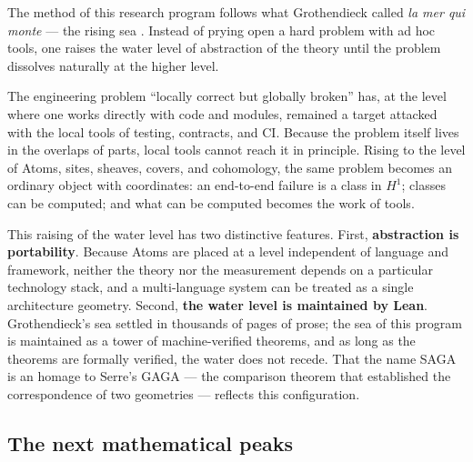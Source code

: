 The method of this research program follows what Grothendieck called
\emph{la mer qui monte} --- the rising sea \citep{grothendieck2022recoltes}.
Instead of prying open a hard problem with ad hoc tools, one raises
the water level of abstraction of the theory until the problem
dissolves naturally at the higher level.

The engineering problem ``locally correct but globally broken'' has,
at the level where one works directly with code and modules, remained
a target attacked with the local tools of testing, contracts, and CI.
Because the problem itself lives in the overlaps of parts, local
tools cannot reach it in principle. Rising to the level of Atoms,
sites, sheaves, covers, and cohomology, the same problem becomes an
ordinary object with coordinates: an end-to-end failure is a class in
$H^1$; classes can be computed; and what can be computed becomes the
work of tools.

This raising of the water level has two distinctive features. First,
\textbf{abstraction is portability}. Because Atoms are placed at a
level independent of language and framework, neither the theory nor
the measurement depends on a particular technology stack, and a
multi-language system can be treated as a single architecture
geometry. Second, \textbf{the water level is maintained by Lean}.
Grothendieck's sea settled in thousands of pages of prose; the sea of
this program is maintained as a tower of machine-verified theorems,
and as long as the theorems are formally verified, the water does not
recede. That the name SAGA is an homage to Serre's GAGA
\citep{serre1956gaga} --- the comparison theorem that established the
correspondence of two geometries --- reflects this configuration.

\subsection{The next mathematical peaks}\label{sec:93}

